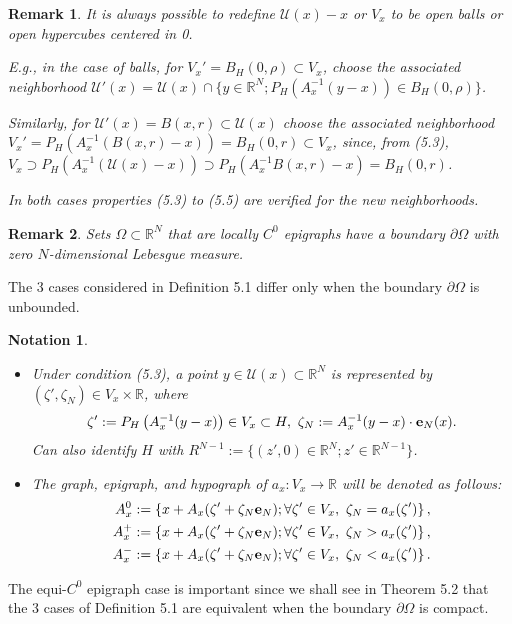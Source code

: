 \documentclass{book}
\numberwithin{equation}{section}
\newtheorem{notation}{Notation}[section]
\newtheorem{remark}{Remark}[section]
\begin{document}
\begin{enumerate}
    \begin{remark}
        It is always possible to redefine $\mathcal{U}(x) - x$ or $V_x$ to be open balls or open hypercubes centered in 0.
        
        E.g., in the case of balls, for $V_x' = B_H(0,\rho)\subset V_x$, choose the associated neighborhood $\mathcal{U}'(x) = \mathcal{U}(x)\cap\{y\in\mathbb{R}^N;P_H(A_x^{-1}(y - x))\in B_H(0,\rho)\}$.
        
        Similarly, for $\mathcal{U}'(x) = B(x,r)\subset\mathcal{U}(x)$ choose the associated neighborhood $V_x' = P_H(A_x^{-1}(B(x,r) - x)) = B_H(0,r)\subset V_x$, since, from (5.3), $V_x\supset P_H(A_x^{-1}(\mathcal{U}(x) - x))\supset P_H(A_x^{-1}B(x,r) - x) = B_H(0,r)$.
        
        In both cases properties (5.3) to (5.5) are verified for the new neighborhoods.
    \end{remark}
    
    \begin{remark}
        Sets $\Omega\subset\mathbb{R}^N$ that are locally $C^0$ epigraphs have a boundary $\partial\Omega$ with zero $N$-dimensional Lebesgue measure.
    \end{remark}
    The 3 cases considered in Definition 5.1 differ only when the boundary $\partial\Omega$ is unbounded.
    
    \begin{notation}
        \begin{itemize}
            \item[(i)] Under condition (5.3), a point $y\in\mathcal{U}(x)\subset\mathbb{R}^N$ is represented by $(\zeta',\zeta_N)\in V_x\times\mathbb{R}$, where
            \begin{align*}
                \zeta' := P_H\left(A_x^{-1}(y - x)\right)\in V_x\subset H,\ \zeta_N := A_x^{-1}(y - x)\cdot{\bf e}_N(x).
            \end{align*}
            Can also identify $H$ with $R^{N - 1} := \{(z',0)\in\mathbb{R}^N;z'\in\mathbb{R}^{N - 1}\}$.
            \item[(ii)] The graph, epigraph, and hypograph of $a_x:V_x\to\mathbb{R}$ will be denoted as follows:
            \begin{align*}
                A_x^0 &:= \left\{x + A_x(\zeta' + \zeta_N{\bf e}_N);\forall\zeta'\in V_x,\ \zeta_N = a_x(\zeta')\right\},\\
                A_x^+ &:= \left\{x + A_x(\zeta' + \zeta_N{\bf e}_N);\forall\zeta'\in V_x,\ \zeta_N > a_x(\zeta')\right\},\\
                A_x^- &:= \left\{x + A_x(\zeta' + \zeta_N{\bf e}_N);\forall\zeta'\in V_x,\ \zeta_N < a_x(\zeta')\right\}.
            \end{align*}
        \end{itemize}
    \end{notation}
    The equi-$C^0$ epigraph case is important since we shall see in Theorem 5.2 that the 3 cases of Definition 5.1 are equivalent when the boundary $\partial\Omega$ is compact.
    

\end{enumerate}
\end{document}

